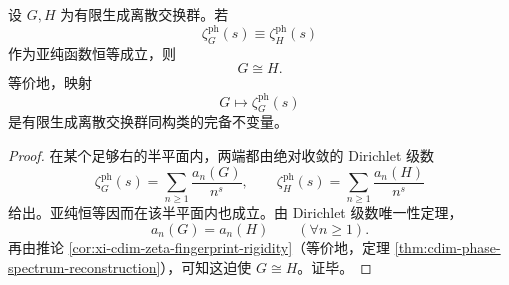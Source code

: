 \begin{theorem}\label{thm:xi-time-part78-phase-zeta-complete-classification}
设 \(G,H\) 为有限生成离散交换群。若
\[
\zeta_G^{\mathrm{ph}}(s)\equiv \zeta_H^{\mathrm{ph}}(s)
\]
作为亚纯函数恒等成立，则
\[
G\cong H.
\]
等价地，映射
\[
G\longmapsto \zeta_G^{\mathrm{ph}}(s)
\]
是有限生成离散交换群同构类的完备不变量。
\end{theorem}
\begin{proof}
在某个足够右的半平面内，两端都由绝对收敛的 Dirichlet 级数
\[
\zeta_G^{\mathrm{ph}}(s)=\sum_{n\ge 1}\frac{a_n(G)}{n^s},
\qquad
\zeta_H^{\mathrm{ph}}(s)=\sum_{n\ge 1}\frac{a_n(H)}{n^s}
\]
给出。亚纯恒等因而在该半平面内也成立。由 Dirichlet 级数唯一性定理，
\[
a_n(G)=a_n(H)\qquad(\forall n\ge 1).
\]
再由推论 \ref{cor:xi-cdim-zeta-fingerprint-rigidity}（等价地，定理 \ref{thm:cdim-phase-spectrum-reconstruction}），可知这迫使 \(G\cong H\)。证毕。
\end{proof}

